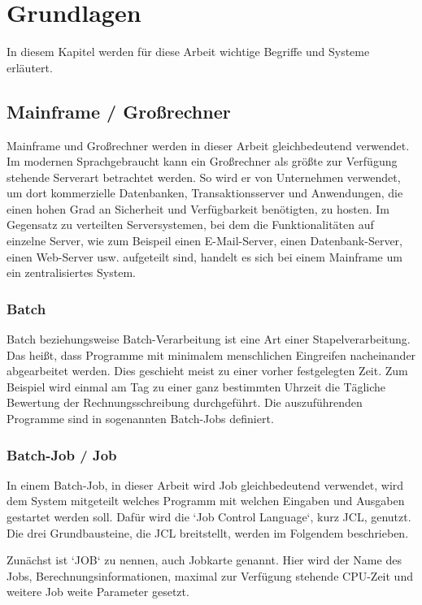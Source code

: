 \chapter{Grundlagen}\label{ch:grundlagen}
In diesem Kapitel werden für diese Arbeit wichtige Begriffe und Systeme erläutert.

\section{Mainframe / Großrechner}
Mainframe und Großrechner werden in dieser Arbeit gleichbedeutend verwendet.
Im modernen Sprachgebraucht kann ein Großrechner als größte zur Verfügung stehende Serverart betrachtet werden.
So wird er von Unternehmen verwendet, um dort kommerzielle Datenbanken, Transaktionsserver und Anwendungen, die einen hohen Grad an Sicherheit und Verfügbarkeit benötigten, zu hosten.
Im Gegensatz zu verteilten Serversystemen, bei dem die Funktionalitäten auf einzelne Server, wie zum Beispeil einen E-Mail-Server, einen Datenbank-Server, einen Web-Server usw. aufgeteilt sind, handelt es sich bei einem Mainframe um ein zentralisiertes System.
\cite{Ebbers.2011}

\subsection{Batch}
Batch beziehungsweise Batch-Verarbeitung ist eine Art einer Stapelverarbeitung.
Das heißt, dass Programme mit minimalem menschlichen Eingreifen nacheinander abgearbeitet werden.
Dies geschieht meist zu einer vorher festgelegten Zeit.
Zum Beispiel wird einmal am Tag zu einer ganz bestimmten Uhrzeit die Tägliche Bewertung der Rechnungsschreibung durchgeführt.
Die auszuführenden Programme sind in sogenannten Batch-Jobs definiert. 
\cite{Ebbers.2011}

\subsection{Batch-Job / Job}
In einem Batch-Job, in dieser Arbeit wird Job gleichbedeutend verwendet, wird dem System mitgeteilt welches Programm mit welchen Eingaben und Ausgaben gestartet werden soll.
Dafür wird die `Job Control Language`, kurz JCL, genutzt.
Die drei Grundbausteine, die JCL breitstellt, werden im Folgendem beschrieben.

Zunächst ist `JOB` zu nennen, auch Jobkarte genannt.
Hier wird der Name des Jobs, Berechnungsinformationen, maximal zur Verfügung stehende CPU-Zeit und weitere Job weite Parameter gesetzt.

